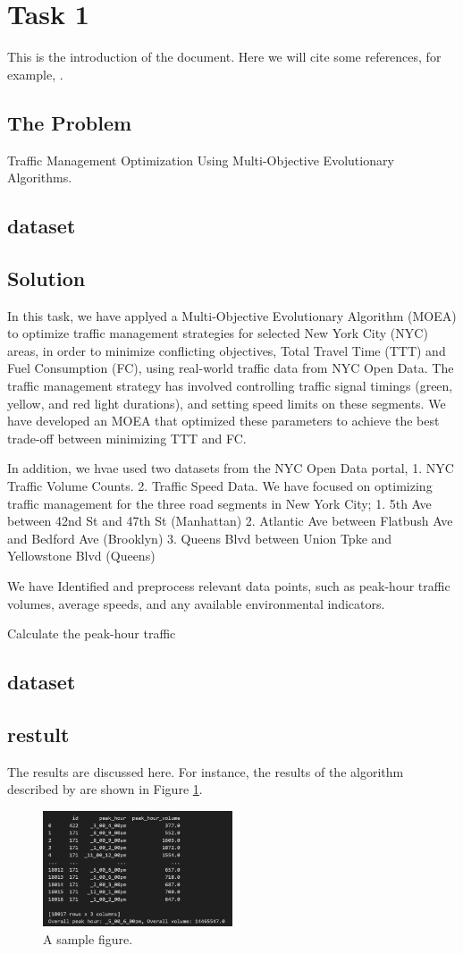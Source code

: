 \section{Task 1}
This is the introduction of the document. Here we will cite some references, for example, \cite{knuth1984texbook}.
\subsection{The Problem}
Traffic Management Optimization Using Multi-Objective Evolutionary Algorithms.
\subsection{dataset}

\subsection{Solution}
In this task, we have applyed a Multi-Objective Evolutionary Algorithm (MOEA) to optimize traffic management
strategies for selected New York City (NYC) areas, in order to  minimize conflicting
objectives, Total Travel Time (TTT) and Fuel Consumption (FC), using real-world traffic data
from NYC Open Data. The traffic management strategy has involved controlling traffic signal timings (green, yellow, and 
red light durations), and setting speed limits on these segments. We have developed an MOEA that optimized these parameters to achieve the best trade-off 
between minimizing TTT and FC.

In addition, we hvae used two datasets from the NYC Open Data portal,
1. NYC Traffic Volume Counts.
2. Traffic Speed Data.
We have focused on optimizing traffic management for the three road segments in New 
York City;  
1. 5th Ave between 42nd St and 47th St (Manhattan) 
2. Atlantic Ave between Flatbush Ave and Bedford Ave (Brooklyn) 
3. Queens Blvd between Union Tpke and Yellowstone Blvd (Queens) 

We have Identified and preprocess relevant data points, such as peak-hour traffic volumes, 
average speeds, and any available environmental indicators.

Calculate the peak-hour traffic


\subsection{dataset}
\subsection{restult}
The results are discussed here. For instance, the results of the algorithm described by \cite{lamport1986latex} are shown in Figure \ref{fig:sample}.

\begin{figure}[h]
    \centering
    \includegraphics[width=0.5\textwidth]{figures/peak_huours.PNG}
    \caption{A sample figure.}
    \label{fig:sample}
\end{figure}
